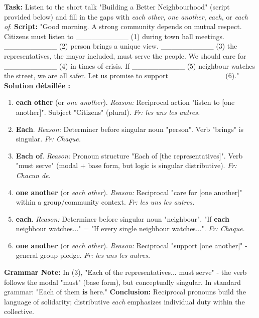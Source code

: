 \documentclass[11pt]{article}
\begin{document}
\begin{exoresolu}
    \textbf{Task:} Listen to the short talk "Building a Better Neighbourhood" (script provided below) and fill in the gaps with \emph{each other}, \emph{one another}, \emph{each}, or \emph{each of}.
    \vspace{0.2cm}
    \textbf{Script:} "Good morning. A strong community depends on mutual respect. Citizens must listen to \_\_\_\_\_\_\_\_\_\_ (1) during town hall meetings. \_\_\_\_\_\_\_\_\_\_ (2) person brings a unique view. \_\_\_\_\_\_\_\_\_\_ (3) the representatives, the mayor included, must serve the people. We should care for \_\_\_\_\_\_\_\_\_\_ (4) in times of crisis. If \_\_\_\_\_\_\_\_\_\_ (5) neighbour watches the street, we are all safer. Let us promise to support \_\_\_\_\_\_\_\_\_\_ (6)."
    \tcblower
    \textbf{Solution détaillée :}
    \begin{enumerate}
        \item \textbf{each other} (or \emph{one another}). \textit{Reason:} Reciprocal action "listen to [one another]". Subject "Citizens" (plural). \textit{Fr: les uns les autres.}
        \item \textbf{Each}. \textit{Reason:} Determiner before singular noun "person". Verb "brings" is singular. \textit{Fr: Chaque.}
        \item \textbf{Each of}. \textit{Reason:} Pronoun structure "Each of [the representatives]". Verb "must serve" (modal + base form, but logic is singular distributive). \textit{Fr: Chacun de.}
        \item \textbf{one another} (or \emph{each other}). \textit{Reason:} Reciprocal "care for [one another]" within a group/community context. \textit{Fr: les uns les autres.}
        \item \textbf{each}. \textit{Reason:} Determiner before singular noun "neighbour". "If \textbf{each} neighbour watches..." = "If every single neighbour watches...". \textit{Fr: Chaque.}
        \item \textbf{one another} (or \emph{each other}). \textit{Reason:} Reciprocal "support [one another]" - general group pledge. \textit{Fr: les uns les autres.}
    \end{enumerate}
    \textbf{Grammar Note:} In (3), "Each of the representatives... must serve" - the verb follows the modal "must" (base form), but conceptually singular. In standard grammar: "Each of them \textbf{is} here."
    \textbf{Conclusion:} Reciprocal pronouns build the language of solidarity; distributive \emph{each} emphasizes individual duty within the collective.
\end{exoresolu}
\end{document}
